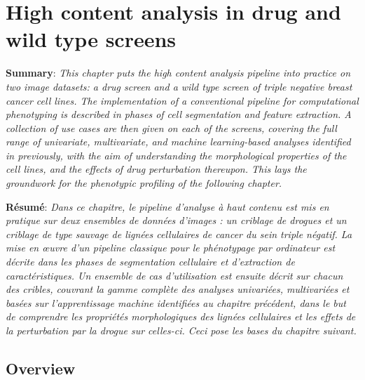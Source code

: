 
\chapter{High content analysis in drug and wild type screens} %
\label{Chapter3} %


\textbf{Summary}: \emph{This chapter puts the high content analysis pipeline into practice on two image datasets: a drug screen and a wild type screen of triple negative breast cancer cell lines. The implementation of a conventional pipeline for computational phenotyping is described in phases of cell segmentation and feature extraction. A collection of use cases are then given on each of the screens, covering the full range of univariate, multivariate, and machine learning-based analyses identified in previously, with the aim of understanding the morphological properties of the cell lines, and the effects of drug perturbation thereupon. This lays the groundwork for the phenotypic profiling of the following chapter.}

\textbf{R\'esum\'e}: \emph{Dans ce chapitre, le pipeline d'analyse \`a haut contenu est mis en pratique sur deux ensembles de donn\'ees d'images : un criblage de drogues et un criblage de type sauvage de lign\'ees cellulaires de cancer du sein triple n\'egatif. La mise en \oe uvre d'un pipeline classique pour le ph\'enotypage par ordinateur est d\'ecrite dans les phases de segmentation cellulaire et d'extraction de caract\'eristiques. Un ensemble de cas d'utilisation est ensuite d\'ecrit sur chacun des cribles, couvrant la gamme compl\`ete des analyses univari\'ees, multivari\'ees et bas\'ees sur l'apprentissage machine identifi\'ees au chapitre pr\'ec\'edent, dans le but de comprendre les propri\'et\'es morphologiques des lign\'ees cellulaires et les effets de la perturbation par la drogue sur celles-ci. Ceci pose les bases du chapitre suivant.}

\section{Overview}

